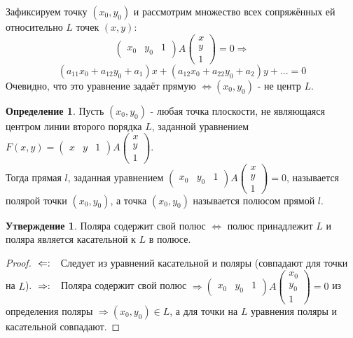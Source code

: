 \documentclass[a4paper, 12pt]{article}
\theoremstyle{definition}
\newtheorem*{definition}{Определение}
\newtheorem*{subtheorem}{Утверждение}
\begin{document}
	Зафиксируем точку $(x_0, y_0)$ и рассмотрим множество всех сопряжённых ей относительно $L$ точек $(x, y)$: $$\begin{pmatrix} x_0&y_0&1 \end{pmatrix}A \begin{pmatrix} x  \\ y \\ 1 \end{pmatrix} = 0 \Rightarrow$$ $$(a_{11}x_0+a_{12}y_0+a_1)x + (a_{12}x_0+a_{22}y_0+a_2)y + ... = 0$$
	Очевидно, что это уравнение задаёт прямую $\Leftrightarrow (x_0, y_0)$ - не центр $L$.
	\begin{definition}
		Пусть $(x_0, y_0)$ - любая точка плоскости, не являющаяся центром линии второго порядка $L$, заданной уравнением $F(x, y) = \begin{pmatrix} x&y&1 \end{pmatrix}A \begin{pmatrix} x  \\ y \\ 1 \end{pmatrix}$. \\Тогда прямая $l$, заданная уравнением $\begin{pmatrix} x_0&y_0&1 \end{pmatrix}A \begin{pmatrix} x  \\ y \\ 1 \end{pmatrix} = 0$, называется полярой точки $(x_0, y_0)$, а точка $(x_0, y_0)$ называется полюсом прямой $l$.
	\end{definition}
	\begin{subtheorem}
		Поляра содержит свой полюс $\Leftrightarrow$ полюс принадлежит $L$ и поляра является касательной к $L$ в полюсе. 
	\end{subtheorem}
	\begin{proof}
		$\\\Leftarrow: \ \ $ Следует из уравнений касательной и поляры (совпадают для точки на $L$).
		$\\\Rightarrow: \ \ $ Поляра содержит свой полюс $\Rightarrow \begin{pmatrix} x_0&y_0&1 \end{pmatrix}A \begin{pmatrix} x_0 \\ y_0 \\ 1 \end{pmatrix} = 0$ из определения поляры $\Rightarrow (x_0, y_0) \in L$, а для точки на $L$ уравнения поляры и касательной совпадают.
	\end{proof}
\end{document}
